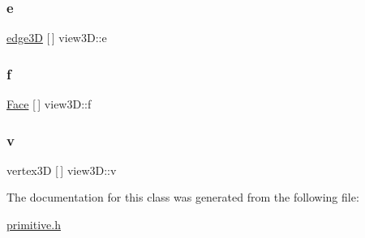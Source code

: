 \subsubsection{\texorpdfstring{e}{e}}
{\footnotesize\ttfamily \mbox{\hyperlink{classedge3_d}{edge3D}} \mbox{[}$\,$\mbox{]} view3\+D\+::e}

\mbox{\label{classview3_d_af8d43cfca632dd12bdb5eb8558b8ae62}} 
\subsubsection{\texorpdfstring{f}{f}}
{\footnotesize\ttfamily \mbox{\hyperlink{class_face}{Face}} \mbox{[}$\,$\mbox{]} view3\+D\+::f}

\mbox{\label{classview3_d_a6a7f3e82c10b2c7476ffd8be0d3ecee2}} 
\subsubsection{\texorpdfstring{v}{v}}
{\footnotesize\ttfamily vertex3D \mbox{[}$\,$\mbox{]} view3\+D\+::v}



The documentation for this class was generated from the following file\+:\begin{DoxyCompactItemize}
\item 
\mbox{\hyperlink{primitive_8h}{primitive.\+h}}\end{DoxyCompactItemize}
